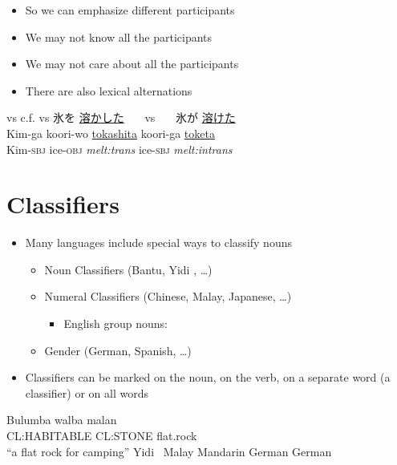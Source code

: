 \documentclass[headrule,footrule]{foils}
\begin{document}

\begin{itemize}
\item So we can emphasize different participants
\item We may not know all the participants
\item We may not care about all the participants
\item There are also lexical alternations
\end{itemize}
\begin{exe}
\ex {} vs 
\ex c.f.  vs 
\makexeCJKactive
\ex \glll {} 氷を \ul{溶かした}  {~~~vs~~~}  氷が \ul{溶けた} \\ 
\makexeCJKinactive
Kim-ga koori-wo \ul{tokashita}  {} koori-ga \ul{toketa} \\
  Kim-\textsc{sbj} ice-\textsc{obj} \textit{melt:trans} 
{} ice-\textsc{sbj} \textit{melt:intrans} \\
\end{exe}


\section{Classifiers}

\MyLogo{}
\begin{itemize}
\item  Many languages include special ways to classify 
nouns
\begin{itemize}
\item  Noun Classifiers (Bantu, Yidi , \ldots) 
\item  Numeral Classifiers (Chinese, Malay, Japanese, \ldots)
  \begin{itemize}
  \item English group nouns: 
  \end{itemize}
\item  Gender (German, Spanish, \ldots)  
\end{itemize}
\item Classifiers can be marked on the noun, on the verb, on a
  separate word (a classifier) or on all words
\end{itemize}

\begin{exe}
  \ex \gll Bulumba walba      malan \\
  CL:HABITABLE CL:STONE  flat.rock \\
  \trans ``a flat rock for camping'' \hfill Yidi\textltailn\  \citep{Dixon:1977}
  \ex {} \hfill Malay
  \ex {}  \hfill Mandarin
  \ex {} \hfill German
  \ex {}\hfill German
\end{exe}
\end{document}

